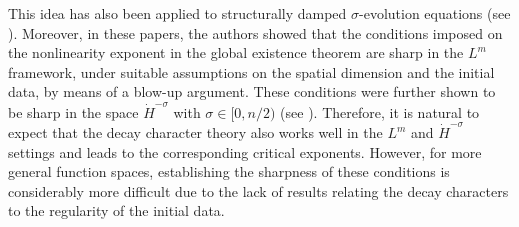 \documentclass[11pt,reqno]{amsart}
\begin{document}
This idea has also been applied to structurally damped $\sigma$-evolution equations (see \cite{ADL2024,ADL2025}). Moreover, in these papers, the authors showed that the conditions imposed on the nonlinearity exponent in the global existence theorem are sharp in the $L^m$ framework, under suitable assumptions on the spatial dimension and the initial data, by means of a blow-up argument. These conditions were further shown to be sharp in the space $\dot{H}^{-\sigma}$ with $\sigma\in[0,n/2)$ (see \cite{Chen2023}). Therefore, it is natural to expect that the decay character theory also works well in the $L^m$ and $\dot{H}^{-\sigma}$ settings and leads to the corresponding critical exponents. However, for more general function spaces, establishing the sharpness of these conditions is considerably more difficult due to the lack of results relating the decay characters to the regularity of the initial data.
\end{document}
